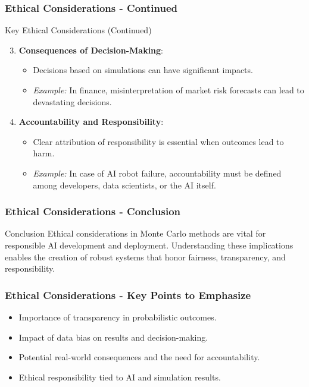 \documentclass[aspectratio=169]{beamer}
\begin{document}
\begin{frame}[fragile]
    \frametitle{Ethical Considerations - Continued}
    \begin{block}{Key Ethical Considerations (Continued)}
        \begin{enumerate}
            \setcounter{enumi}{2}
            \item \textbf{Consequences of Decision-Making}:
            \begin{itemize}
                \item Decisions based on simulations can have significant impacts.
                \item \textit{Example:} In finance, misinterpretation of market risk forecasts can lead to devastating decisions.
            \end{itemize}

            \item \textbf{Accountability and Responsibility}:
            \begin{itemize}
                \item Clear attribution of responsibility is essential when outcomes lead to harm.
                \item \textit{Example:} In case of AI robot failure, accountability must be defined among developers, data scientists, or the AI itself.
            \end{itemize}
        \end{enumerate}
    \end{block}
\end{frame}

\begin{frame}[fragile]
    \frametitle{Ethical Considerations - Conclusion}
    \begin{block}{Conclusion}
        Ethical considerations in Monte Carlo methods are vital for responsible AI development and deployment. Understanding these implications enables the creation of robust systems that honor fairness, transparency, and responsibility.
    \end{block}
\end{frame}

\begin{frame}[fragile]
    \frametitle{Ethical Considerations - Key Points to Emphasize}
    \begin{itemize}
        \item Importance of transparency in probabilistic outcomes.
        \item Impact of data bias on results and decision-making.
        \item Potential real-world consequences and the need for accountability.
        \item Ethical responsibility tied to AI and simulation results.
    \end{itemize}
\end{frame}
\end{document}
